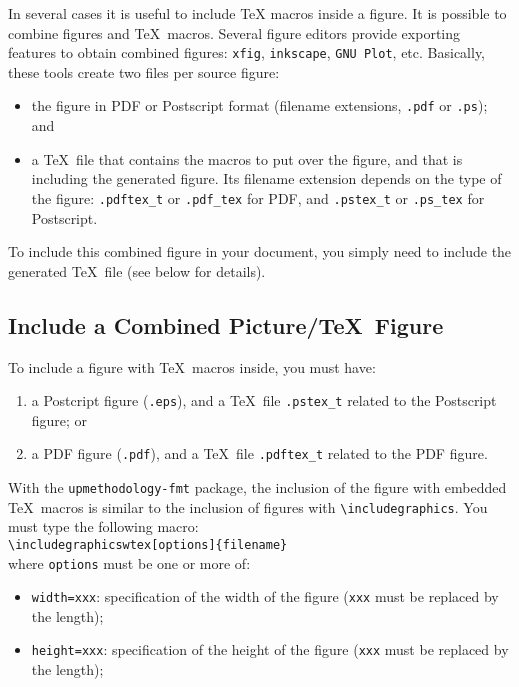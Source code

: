 \documentclass[book]{upmethodology-document}
\begin{document}
In several cases it is useful to include \TeX\xspace macros inside a figure. It is possible to combine figures and \TeX\ macros. Several figure editors provide exporting features to obtain combined figures: \texttt{xfig}, \texttt{inkscape}, \texttt{GNU Plot}, etc. Basically, these tools create two files per source figure: \begin{itemize}
\item the figure in PDF or Postscript format (filename extensions, \texttt{.pdf} or \texttt{.ps}); and
\item a \TeX\ file that contains the macros to put over the figure, and that is including the generated figure. Its filename extension depends on the type of the figure: \texttt{.pdftex\_t} or \texttt{.pdf\_tex} for PDF, and \texttt{.pstex\_t} or \texttt{.ps\_tex} for Postscript.
\end{itemize}
To include this combined figure in your document, you simply need to include the generated \TeX\ file (see below for details).

\subsection{Include a Combined Picture/\TeX\ Figure}

To include a figure with \TeX\ macros inside, you must have: \begin{enumerate}
\item a Postcript figure (\texttt{.eps}), and a \TeX\ file \texttt{.pstex\_t} related to the Postscript figure; or
\item a PDF figure (\texttt{.pdf}), and a \TeX\ file \texttt{.pdftex\_t} related to the PDF figure.
\end{enumerate}

With the \texttt{upmethodology-fmt} package, the inclusion of the figure with embedded \TeX\ macros is similar to the inclusion of figures with \texttt{{\textbackslash}includegraphics}. You must type the following macro: \\
\texttt{{\textbackslash}includegraphicswtex[options]\{filename\}} \\
where \texttt{options} must be one or more of: \begin{itemize}
\item \texttt{width=xxx}: specification of the width of the figure (\texttt{xxx} must be replaced by the length);
\item \texttt{height=xxx}: specification of the height of the figure (\texttt{xxx} must be replaced by the length);
\end{itemize}
\end{document}
